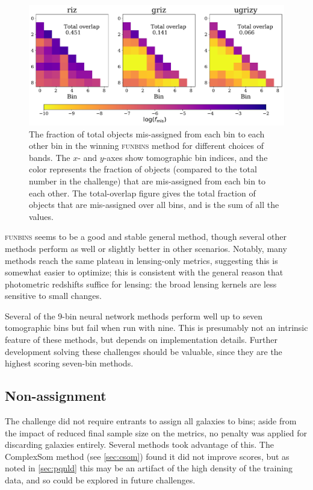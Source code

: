 \documentclass[twocolumn,twocolappendix]{aastex63}
\begin{document}
\begin{figure}[htbp]
\includegraphics[width=0.9\linewidth]{results/nzoverlap_dc2_funbins.pdf}
\caption{The fraction of total objects mis-assigned from each bin to each other bin in the winning 
\textsc{funbins} method for different choices of bands.  The $x$- and $y$-axes show tomographic bin indices, 
and the color represents the fraction of objects (compared to the total number in the challenge) that are 
mis-assigned from each bin to each other.  The total-overlap figure gives the total fraction of objects
that are mis-assigned over all bins, and is the sum of all the values.}
\label{fig:overlap}
\end{figure}


\textsc{funbins} seems to be a good and stable general method, though several other methods perform as well
or slightly better in other scenarios.  Notably, many methods reach the same plateau in lensing-only metrics,
suggesting this is somewhat easier to optimize; this is consistent with the general reason that photometric
redshifts suffice for lensing: the broad lensing kernels are less sensitive to small changes.

Several of the 9-bin neural network methods perform well up to seven tomographic bins but fail when run with 
nine.  This is presumably not an intrinsic feature of these methods, but depends on implementation details.
Further development solving these challenges should be valuable, since they are the highest scoring seven-bin
methods.

\subsection{Non-assignment}
The challenge did not require entrants to assign all galaxies to bins; aside from the impact of reduced final sample size on the metrics, no penalty was applied for discarding galaxies entirely.  Several methods
took advantage of this.  The ComplexSom method (see \autoref{sec:csom}) found
it did not improve scores, but as noted in \autoref{sec:pqnld} this may be an artifact
of the high density of the training data, and so could be explored in future challenges.
\end{document}
